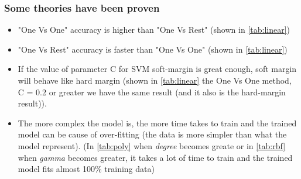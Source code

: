 \subsubsection*{Some theories have been proven}
\begin{itemize}
\item "One Vs One" accuracy is higher than "One Vs Rest" (shown in \ref{tab:linear})
\item "One Vs Rest" accuracy is faster than "One Vs One" (shown in \ref{tab:linear})
\item If the value of parameter C for SVM soft-margin is great enough, soft margin will behave like hard margin (shown in \ref{tab:linear} the One Vs One method, C = 0.2 or greater we have the same result (and it also is the hard-margin result)).
\item The more complex the model is, the more time takes to train and the trained model can be cause of over-fitting (the data is more simpler than what the model represent). (In \ref{tab:poly} when \textit{degree} becomes greate or in \ref{tab:rbf} when \textit{gamma} becomes greater, it takes a lot of time to train and the trained model fits almost 100\% training data)
\end{itemize}